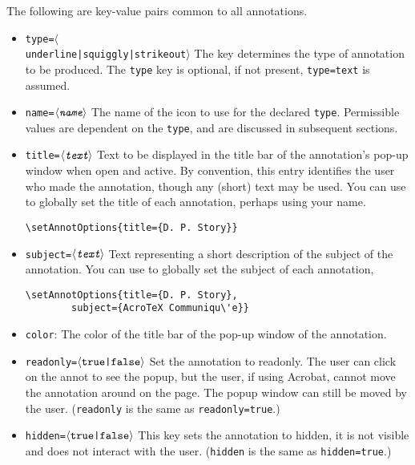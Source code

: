 \documentclass[12pt]{article}
\let\app\textsf
\def\ameta#1{$\langle\textit{\texttt{#1}}\rangle$}
\begin{document}
The following are key-value pairs common to all annotations.


\begin{itemize}
  \item \texttt{type=$\langle$}\\
        \texttt{underline|squiggly|strikeout$\rangle$} The key determines
        the type of annotation to be produced. The \texttt{type} key is
        optional, if not present, \texttt{type=text} is assumed.
  \item \texttt{name=\ameta{name}} The name of the icon to use for the declared \texttt{type}. Permissible
        values are dependent on the \texttt{type}, and are discussed in subsequent sections.
  \item \texttt{title=\ameta{text}} Text to be displayed in the title bar of the annotation's pop-up window
        when open and active. By convention, this entry identifies the user who made the annotation,
        though any (short) text may be used. You can use  to globally set
        the title of each annotation, perhaps using your name.
\begin{Verbatim}[fontsize=\small]
    \setAnnotOptions{title={D. P. Story}}
\end{Verbatim}
  \item \texttt{subject=\ameta{text}} Text representing a short description of the subject of the annotation.
    You can use  to globally set the subject of each annotation,
\begin{Verbatim}[fontsize=\small]
    \setAnnotOptions{title={D. P. Story},
        subject={AcroTeX Communiqu\'e}}
\end{Verbatim}
  \item \texttt{color}: The color of the title bar of the pop-up window of the annotation.
  \item \texttt{readonly=\ameta{\upshape{true|false}}} Set the annotation to readonly. The user can click on the annot to
    see the popup, but the user, if using \app{Acrobat}, cannot move the annotation around on the page.
    The popup window can still be moved by the user. (\texttt{readonly} is the same as \texttt{readonly=true}.)
  \item \texttt{hidden=\ameta{\upshape{true|false}}} This key sets the annotation to hidden, it is not visible
  and does not interact with the user. (\texttt{hidden} is the same as \texttt{hidden=true}.)

\end{itemize}
\end{document}
